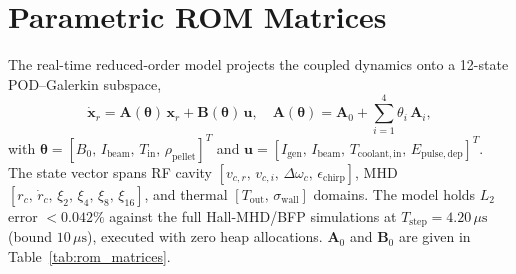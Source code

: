 \documentclass[10pt,journal,compsoc]{IEEEtran}
\newcommand{\mus}{\,\mu\mathrm{s}}
\begin{document}
\begin{table}[h]
\centering
\caption{Empirical Test and Diagnostic Matrix}
\label{tab:astm}
\end{table}

\section{Parametric ROM Matrices}
\label{app:rom}
The real-time reduced-order model projects the coupled dynamics onto a
12-state POD--Galerkin subspace,
\begin{equation}
\dot{\mathbf{x}}_r = \mathbf{A}(\boldsymbol{\theta})\,\mathbf{x}_r
+ \mathbf{B}(\boldsymbol{\theta})\,\mathbf{u},\quad
\mathbf{A}(\boldsymbol{\theta}) = \mathbf{A}_0 +
\textstyle\sum_{i=1}^{4}\theta_i\,\mathbf{A}_i,
\end{equation}
with $\boldsymbol{\theta} = [B_0,\, I_{\mathrm{beam}},\,
T_{\mathrm{in}},\, \rho_{\mathrm{pellet}}]^T$ and $\mathbf{u} =
[I_{\mathrm{gen}},\, I_{\mathrm{beam}},\, T_{\mathrm{coolant,in}},\,
E_{\mathrm{pulse,dep}}]^T$. The state vector spans RF cavity
$[v_{c,r},\, v_{c,i},\, \Delta\omega_c,\, \epsilon_{\mathrm{chirp}}]$,
MHD $[r_c,\, \dot r_c,\, \xi_2,\, \xi_4,\, \xi_8,\, \xi_{16}]$, and
thermal $[T_{\mathrm{out}},\, \sigma_{\mathrm{wall}}]$ domains. The
model holds $L_2$ error $< 0.042\%$ against the full Hall-MHD/BFP
simulations at $T_{\mathrm{step}} = 4.20\mus$ (bound $10\mus$), executed
with zero heap allocations. $\mathbf{A}_0$ and $\mathbf{B}_0$ are given
in Table~\ref{tab:rom_matrices}.
\end{document}
